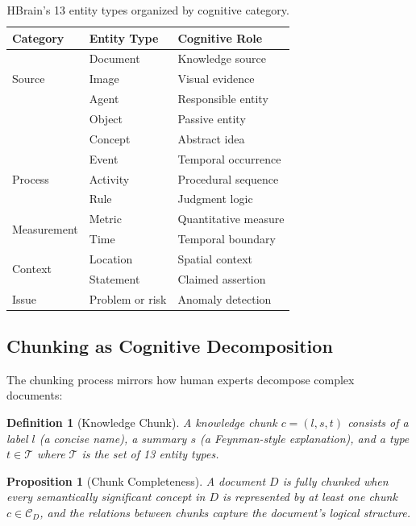 \documentclass[11pt]{article}
\newtheorem{definition}{Definition}
\newtheorem{proposition}{Proposition}
\begin{document}
\begin{table}[htbp]
\centering
\caption{HBrain's 13 entity types organized by cognitive category.}
\label{tab:entity-types}
\begin{tabular}{@{}lll@{}}
\toprule
\textbf{Category} & \textbf{Entity Type} & \textbf{Cognitive Role} \\
\midrule
\multirow{3}{*}{Source}
& Document & Knowledge source \\
& Image & Visual evidence \\
\midrule
\multirow{3}{*}{Actor}
& Agent & Responsible entity \\
& Object & Passive entity \\
& Concept & Abstract idea \\
\midrule
\multirow{3}{*}{Process}
& Event & Temporal occurrence \\
& Activity & Procedural sequence \\
& Rule & Judgment logic \\
\midrule
\multirow{2}{*}{Measurement}
& Metric & Quantitative measure \\
& Time & Temporal boundary \\
\midrule
\multirow{2}{*}{Context}
& Location & Spatial context \\
& Statement & Claimed assertion \\
\midrule
Issue & Problem or risk & Anomaly detection \\
\bottomrule
\end{tabular}
\end{table}

\subsection{Chunking as Cognitive Decomposition}

The chunking process mirrors how human experts decompose complex documents:

\begin{definition}[Knowledge Chunk]
A knowledge chunk $c = (l, s, t)$ consists of a label $l$ (a concise name), a summary $s$ (a Feynman-style explanation), and a type $t \in \mathcal{T}$ where $\mathcal{T}$ is the set of 13 entity types.
\end{definition}

\begin{proposition}[Chunk Completeness]
A document $D$ is fully chunked when every semantically significant concept in $D$ is represented by at least one chunk $c \in \mathcal{C}_D$, and the relations between chunks capture the document's logical structure.
\end{proposition}
\end{document}
